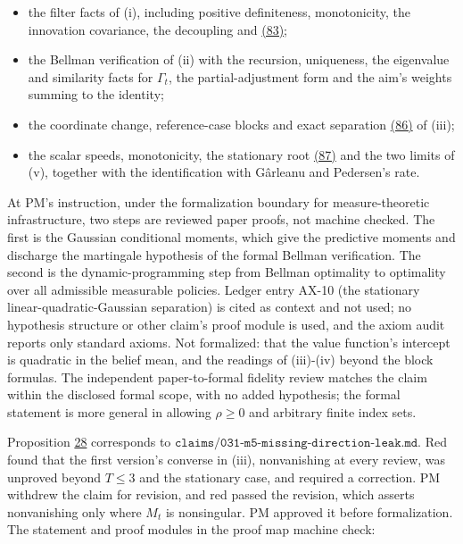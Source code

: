 \documentclass[11pt]{article}
\begin{document}
\begin{itemize}
  \item the filter facts of (i), including positive definiteness,
  monotonicity, the innovation covariance, the decoupling and \hyperref[eq:83]{(83)};
  \item the Bellman verification of (ii) with the recursion, uniqueness,
  the eigenvalue and similarity facts for \(\Gamma_t\), the
  partial-adjustment form and the aim's weights summing to the
  identity;
  \item the coordinate change, reference-case blocks and exact separation
  \hyperref[eq:86]{(86)} of (iii);
  \item the scalar speeds, monotonicity, the stationary root \hyperref[eq:87]{(87)} and the
  two limits of (v), together with the identification with Gârleanu
  and Pedersen's rate.
\end{itemize}

At PM's instruction, under the formalization boundary for
measure-theoretic infrastructure, two steps are reviewed paper
proofs, not machine checked. The first is the Gaussian conditional
moments, which give the predictive moments and discharge the
martingale hypothesis of the formal Bellman verification. The second
is the dynamic-programming step from Bellman optimality to optimality
over all admissible measurable policies. Ledger entry AX-10 (the
stationary linear-quadratic-Gaussian separation) is cited as context
and not used; no hypothesis structure or other claim's proof module
is used, and the axiom audit reports only standard axioms. Not
formalized: that the value function's intercept is quadratic in the
belief mean, and the readings of (iii)-(iv) beyond the block
formulas. The independent paper-to-formal fidelity review matches the
claim within the disclosed formal scope, with no added hypothesis; the
formal statement is more general in allowing \(\rho\geq0\) and arbitrary
finite index sets.

Proposition \hyperref[res:Proposition-28]{28} corresponds to
\(\texttt{claims/031-m5-missing-direction-leak.md}\). Red found that
the first version's converse in (iii), nonvanishing at every review,
was unproved beyond \(T\leq3\) and the stationary case, and required a
correction. PM withdrew the claim for revision, and red passed the
revision, which asserts nonvanishing only where \(M_t\) is
nonsingular. PM approved it before formalization. The statement and
proof modules in the proof map machine check:
\end{document}
